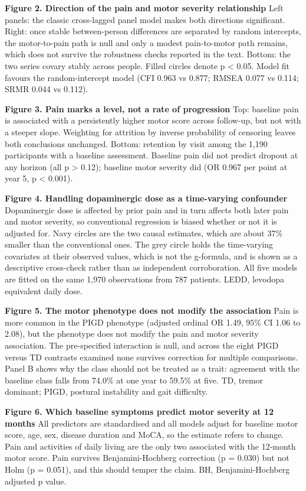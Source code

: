 \documentclass[
  english,
  12pt,
]{article}
\begin{document}
\textbf{Figure 2. Direction of the pain and motor severity relationship} Left panels: the classic cross-lagged panel model makes both directions significant. Right: once stable between-person differences are separated by random intercepts, the motor-to-pain path is null and only a modest pain-to-motor path remains, which does not survive the robustness checks reported in the text. Bottom: the two series covary stably across people. Filled circles denote p \textless{} 0.05. Model fit favours the random-intercept model (CFI 0.963 vs 0.877; RMSEA 0.077 vs 0.114; SRMR 0.044 vs 0.112).

\textbf{Figure 3. Pain marks a level, not a rate of progression} Top: baseline pain is associated with a persistently higher motor score across follow-up, but not with a steeper slope. Weighting for attrition by inverse probability of censoring leaves both conclusions unchanged. Bottom: retention by visit among the 1,190 participants with a baseline assessment. Baseline pain did not predict dropout at any horizon (all p \textgreater{} 0.12); baseline motor severity did (OR 0.967 per point at year 5, p \textless{} 0.001).

\textbf{Figure 4. Handling dopaminergic dose as a time-varying confounder} Dopaminergic dose is affected by prior pain and in turn affects both later pain and motor severity, so conventional regression is biased whether or not it is adjusted for. Navy circles are the two causal estimates, which are about 37\% smaller than the conventional ones. The grey circle holds the time-varying covariates at their observed values, which is not the g-formula, and is shown as a descriptive cross-check rather than as independent corroboration. All five models are fitted on the same 1,970 observations from 787 patients. LEDD, levodopa equivalent daily dose.

\textbf{Figure 5. The motor phenotype does not modify the association} Pain is more common in the PIGD phenotype (adjusted ordinal OR 1.49, 95\% CI 1.06 to 2.08), but the phenotype does not modify the pain and motor severity association. The pre-specified interaction is null, and across the eight PIGD versus TD contrasts examined none survives correction for multiple comparisons. Panel B shows why the class should not be treated as a trait: agreement with the baseline class falls from 74.0\% at one year to 59.5\% at five. TD, tremor dominant; PIGD, postural instability and gait difficulty.

\textbf{Figure 6. Which baseline symptoms predict motor severity at 12 months} All predictors are standardised and all models adjust for baseline motor score, age, sex, disease duration and MoCA, so the estimate refers to change. Pain and activities of daily living are the only two associated with the 12-month motor score. Pain survives Benjamini-Hochberg correction (p = 0.030) but not Holm (p = 0.051), and this should temper the claim. BH, Benjamini-Hochberg adjusted p value.
\end{document}
